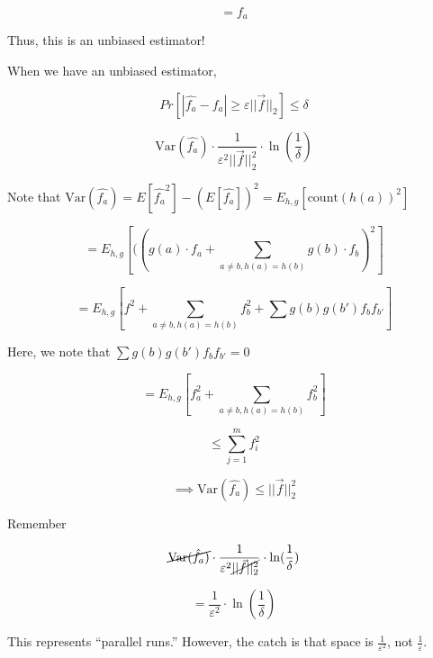 \documentclass[11pt]{article}
\begin{document}
\[= f_a\]

Thus, this is an unbiased estimator!

When we have an unbiased estimator,

\[Pr[ |\hat{f_a} - f_a| \geq \varepsilon || \vec{f}||_2] \leq \delta \]

\[\text{Var}(\hat{f_a}) \cdot \frac{1}{\varepsilon^2 ||\vec{f}||^2_2} \cdot \ln(\frac{1}{\delta})\]

Note that $\text{Var}(\hat{f_a}) = E[\hat{f_a}^2] - (E[\hat{f_a}])^2 = E_{h, g} [\text{count}(h(a))^2]$

\[= E_{h,g} [((g(a) \cdot f_a + \sum_{a \neq b, h(a) = h(b)} g(b) \cdot f_b)^2] \]

\[= E_{h,g} [f^2 + \sum_{a \neq b, h(a) = h(b)} f^2_b + \sum g(b) g(b') f_b f_{b'}]\]

Here, we note that $\sum g(b) g(b') f_b f_{b'} = 0$

\[= E_{h,g} [f_a^2 + \sum_{a \neq b, h(a) = h(b)} f^2_b] \]

\[ \leq \sum_{j = 1}^m f_i^2\]

\[\implies \text{Var}(\hat{f_a}) \leq ||\vec{f}||_2^2\]

Remember

\[ \cancel{\text{Var}(\hat{f_a})} \cdot \frac{1}{\varepsilon^2 \cancel{||\vec{f}||^2_2}} \cdot \ln(\frac{1}{\delta})\]

\[ = \frac{1}{\varepsilon^2} \cdot \ln(\frac{1}{\delta})\]

This represents ``parallel runs.'' However, the catch is that space is $\frac{1}{\varepsilon^2}$, not $\frac{1}{\varepsilon}$.
\end{document}
